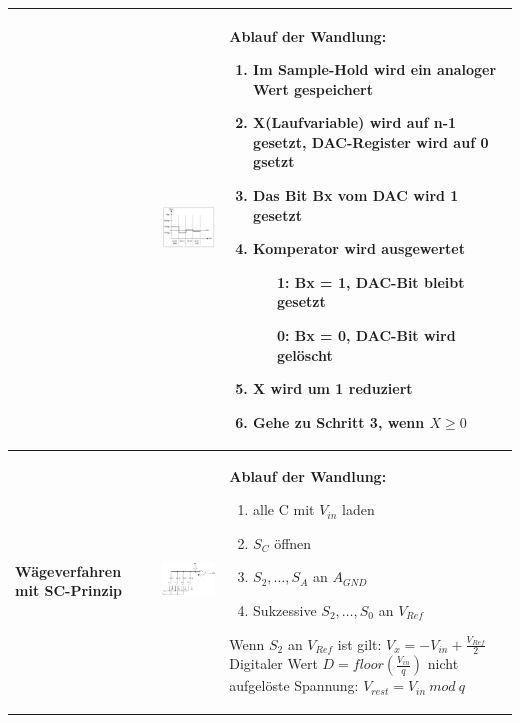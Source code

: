 \begin{longtable}{|>{\bfseries}p{4cm}|p{6cm}|p{8cm}|}
    &
    \includegraphics[width=6cm, valign=t]{pictures/prinzip_SAR.png} &
    \textbf{Ablauf der Wandlung:}
    \begin{enumerate}
      \item Im Sample-Hold wird ein analoger Wert gespeichert
      \item X(Laufvariable) wird auf n-1 gesetzt, DAC-Register wird auf 0 gsetzt
      \item Das Bit Bx vom DAC wird 1 gesetzt
      \item Komperator wird ausgewertet
            \begin{itemize}
              \item[1:] Bx = 1, DAC-Bit bleibt gesetzt
              \item[0:] Bx = 0, DAC-Bit wird gelöscht
            \end{itemize}
      \item X wird um 1 reduziert
      \item Gehe zu Schritt 3, wenn $X \geq 0$ 
    \end{enumerate} \\
  \hline
    Wägeverfahren mit SC-Prinzip &
    \includegraphics[width=6cm, valign=t]{pictures/waegeverfahrenSC} &
    \textbf{Ablauf der Wandlung:}
    \begin{enumerate}
      \item alle C mit $V_{in}$ laden
      \item $S_C$ öffnen
      \item $S_2, \ldots, S_A$ an $A_{GND}$
      \item Sukzessive $S_2, \ldots, S_0$ an $V_{Ref}$
    \end{enumerate}
    Wenn $S_2$ an $V_{Ref}$ ist gilt: $V_x = -V_{in}+\frac{V_{Ref}}{2}$ \newline
    Digitaler Wert $D = floor\left( \frac{V_{in}}{q}\right)$ \newline
    nicht aufgelöste Spannung: $V_{rest} = V_{in} \ mod \ q$\\
  \hline
\end{longtable}


